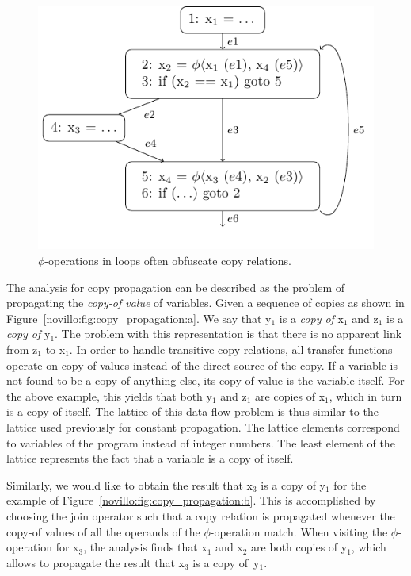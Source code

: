 \begin{figure}[b!]
  \begin{center}
    \includegraphics{copy_propagation_loop}
  \end{center}
  \vspace{-1em}
  \caption{$\phi$-operations in loops often obfuscate copy relations.}
  \label{novillo:fig:copy_propagation_loop}
\end{figure}

The analysis for copy propagation can be described as the problem of
propagating the \textit{copy-of value} of variables.  Given a sequence of
copies as shown in Figure~\ref{novillo:fig:copy_propagation:a}. We say that
y$_1$ is a \textit{copy of} x$_1$ and z$_1$ is a \textit{copy of} y$_1$.  The
problem with this representation is that there is no apparent link from z$_1$ to
x$_1$.  In order to handle transitive copy relations, all transfer functions
operate on copy-of values instead of the direct source of the copy.  If a
variable is not found to be a copy of anything else, its copy-of value is the
variable itself. For the above example, this yields that both y$_1$ and z$_1$
are copies of x$_1$, which in turn is a copy of itself. The lattice of this data
flow problem is thus similar to the lattice used previously for constant
propagation. The lattice elements correspond to variables of the
program instead of integer numbers. The least element of the lattice
represents the fact that a variable is a copy of itself.

Similarly, we would like to obtain the result that x$_3$ is a copy of y$_1$ for
the example of Figure~\ref{novillo:fig:copy_propagation:b}. This is
accomplished by choosing the join operator such that a copy relation is
propagated whenever the copy-of values of all the operands of the $\phi$-operation
match. When visiting the $\phi$-operation for x$_3$, the analysis finds
that x$_1$ and x$_2$ are both copies of y$_1$, which allows to propagate the
result that x$_3$ is a copy of~y$_1$.

